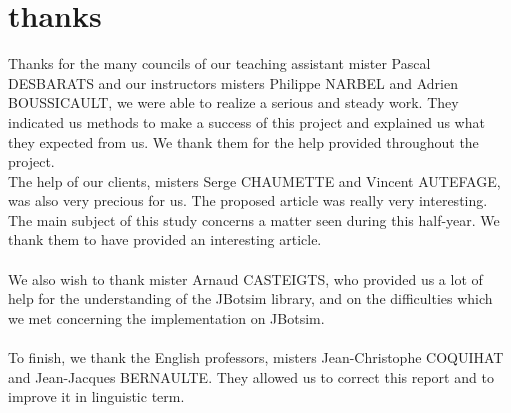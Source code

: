 \chapter*{thanks}

Thanks for the many councils of our teaching assistant mister Pascal DESBARATS and our instructors misters Philippe NARBEL and Adrien BOUSSICAULT, we were able to realize a serious and steady work. They indicated us methods to make a success of this project and explained us what they expected from us. We thank them for the help provided throughout the project.\\

The help of our clients, misters Serge CHAUMETTE and Vincent AUTEFAGE, was also very precious for us. The proposed article was really very interesting. The main subject of this study concerns a matter seen during this half-year. We thank them to have provided an interesting article.\\\\

We also wish to thank mister Arnaud CASTEIGTS, who provided us a lot of help for the understanding of the JBotsim library, and on the difficulties which we met concerning the implementation on JBotsim.\\\\

To finish, we thank the English professors, misters Jean-Christophe COQUIHAT and Jean-Jacques BERNAULTE. They allowed us to correct this report and to improve it in linguistic term.
